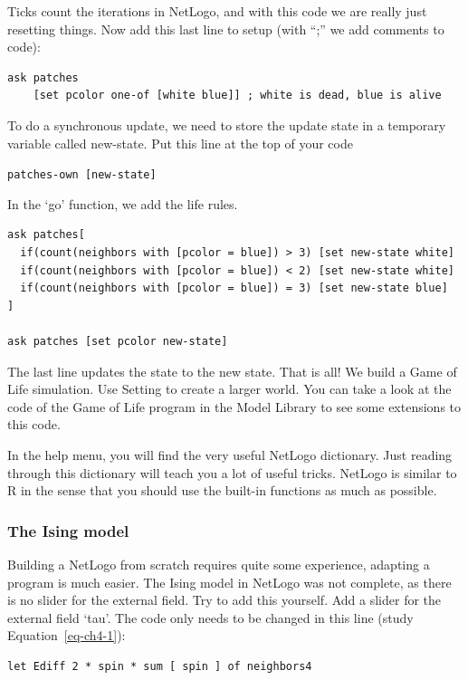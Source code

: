 \documentclass[
  letterpaper,
]{scrbook}
\begin{document}
Ticks count the iterations in NetLogo, and with this code we are really
just resetting things. Now add this last line to setup (with ``;'' we
add comments to code):

\begin{verbatim}
ask patches
    [set pcolor one-of [white blue]] ; white is dead, blue is alive
\end{verbatim}

To do a synchronous update, we need to store the update state in a
temporary variable called new-state. Put this line at the top of your
code

\texttt{patches-own\ {[}new-state{]}}

In the `go' function, we add the life rules.

\begin{verbatim}
ask patches[
  if(count(neighbors with [pcolor = blue]) > 3) [set new-state white]
  if(count(neighbors with [pcolor = blue]) < 2) [set new-state white]
  if(count(neighbors with [pcolor = blue]) = 3) [set new-state blue]
]

ask patches [set pcolor new-state]
\end{verbatim}

The last line updates the state to the new state. That is all! We build
a Game of Life simulation. Use Setting to create a larger world. You can
take a look at the code of the Game of Life program in the Model Library
to see some extensions to this code.

In the help menu, you will find the very useful NetLogo dictionary. Just
reading through this dictionary will teach you a lot of useful tricks.
NetLogo is similar to R in the sense that you should use the built-in
functions as much as possible.

\hypertarget{the-ising-model}{%
\subsubsection{The Ising model}\label{the-ising-model}}

Building a NetLogo from scratch requires quite some experience, adapting
a program is much easier. The Ising model in NetLogo was not complete,
as there is no slider for the external field. Try to add this yourself.
Add a slider for the external field `tau'. The code only needs to be
changed in this line (study Equation~\ref{eq-ch4-1}):

\begin{verbatim}
let Ediff 2 * spin * sum [ spin ] of neighbors4
\end{verbatim}
\end{document}
